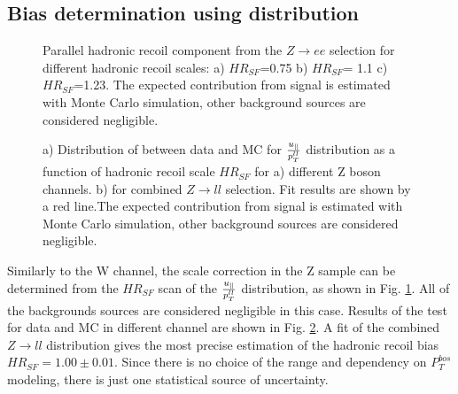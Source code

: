 \subsection{Bias determination using \upar distribution}




\begin{figure}[!tbp]
\endminipage\hfill
{}
\endminipage\hfill
{}%
\endminipage
\caption{Parallel hadronic recoil component \upar from the $Z\to ee$ selection for different hadronic recoil scales: a) $HR_{SF}$=0.75 b) $HR_{SF}$= 1.1 c) $HR_{SF}$=1.23. The expected contribution from signal is estimated with Monte Carlo simulation, other background sources are considered negligible.}
\label{HadrRecoil:ZScan}
\end{figure}

\begin{figure}[!tbp]
\begin{minipage}[h]{0.49\linewidth}
\end{minipage}
\hfill
\begin{minipage}[h]{0.49\linewidth}
\end{minipage}
\caption{a) Distribution of \chiD  between data and MC for $\frac{u_{\parallel}}{p_T^{ll}}$ distribution as a function of hadronic recoil scale $HR_{SF}$ for a) different Z boson channels. 
b) for combined $Z \to ll$ selection. Fit results are shown by a red line.The expected contribution from signal is estimated with Monte Carlo simulation, other background sources are considered negligible.}
\label{uPAr}
\end{figure}  
 
Similarly to the W channel, the scale correction in the Z sample can be determined from the $HR_{SF}$ scan of the $\frac{u_{\parallel}}{p_T^{ll}}$ distribution, as shown in Fig. \ref{HadrRecoil:ZScan}. All of the backgrounds sources are considered negligible in this case. Results of the \chiD test for data and MC in different channel are shown in Fig. \ref{uPAr}. A fit of the combined $Z \to ll$ distribution gives the most precise estimation of the hadronic recoil bias $HR_{SF} = 1.00 \pm 0.01$.  Since there is no choice of the range and dependency on $P_T^{bos}$ modeling, there is just one statistical source of uncertainty.



